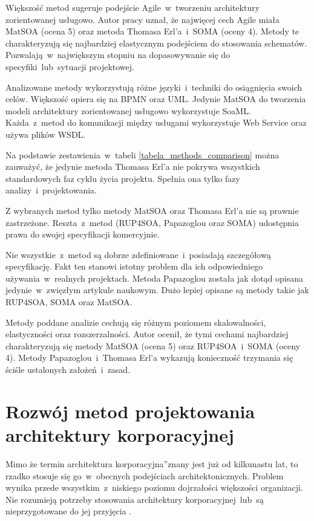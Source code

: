 Większość metod sugeruje podejście Agile~w~tworzeniu architektury zorientowanej usługowo. Autor pracy uznał, że najwięcej cech Agile miała MatSOA (ocena 5) oraz metoda Thomasa Erl'a~i~SOMA (oceny 4). Metody te charakteryzują się najbardziej elastycznym podejściem do stosowania schematów. Pozwalają~w~największym stopniu na dopasowywanie się do specyfiki~lub~sytuacji projektowej.

Analizowane metody wykorzystują różne języki~i~techniki do osiągnięcia swoich celów. Większość opiera się na BPMN oraz UML. Jedynie MatSOA do tworzenia modeli architektury zorientowanej usługowo wykorzystuje SoaML. Każda~z~metod do komunikacji między usługami wykorzystuje Web Service oraz używa plików WSDL.

Na podstawie zestawienia~w~tabeli \ref{tabela_methods_comparison} można zauważyć, że jedynie metoda Thomasa Erl'a nie pokrywa wszystkich standardowych faz cyklu życia projektu. Spełnia ona tylko fazy analizy~i~projektowania.

Z wybranych metod tylko metody MatSOA oraz Thomasa Erl'a nie są prawnie zastrzeżone. Reszta~z~metod (RUP4SOA, Papazoglou oraz SOMA) udostępnia prawa do swojej specyfikacji komercyjnie. 

Nie wszystkie~z~metod są dobrze zdefiniowane~i~posiadają szczegółową specyfikację. Fakt ten stanowi istotny problem dla ich odpowiedniego używania~w~realnych projektach. Metoda Papazoglou została jak dotąd opisana jedynie~w~zwięzłym artykule naukowym. Dużo lepiej opisane są metody takie jak RUP4SOA, SOMA oraz MatSOA. 

Metody poddane analizie cechują się różnym poziomem skalowalności, elastyczności oraz rozszerzalności. Autor ocenił, że tymi cechami najbardziej charakteryzują się metody MatSOA (ocena 5) oraz RUP4SOA~i~SOMA (oceny 4). Metody Papazoglou~i~Thomasa Erl'a wykazują konieczność trzymania się ściśle ustalonych założeń~i~zasad.

\section{Rozwój metod projektowania architektury korporacyjnej}
Mimo że termin \quotedblbase architektura korporacyjna\textquotedblright znany jest już od kilkunastu lat, to rzadko stosuje się go~w~obecnych podejściach architektonicznych. Problem wynika przede wszystkim~z~niskiego poziomu dojrzałości większości organizacji.  Nie rozumieją potrzeby stosowania architektury korporacyjnej~lub~są nieprzygotowane do jej przyjęcia \cite{SobArchKorpProg}. 

